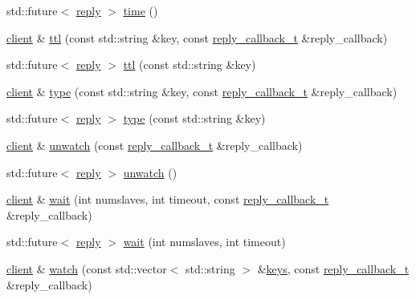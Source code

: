 \begin{DoxyCompactItemize}
std\+::future$<$ \hyperlink{classcpp__redis_1_1reply}{reply} $>$ \hyperlink{classcpp__redis_1_1client_a7d0d5e0a02e97ad6d8733430489df321}{time} ()
\item 
\hyperlink{classcpp__redis_1_1client}{client} \& \hyperlink{classcpp__redis_1_1client_a667bb7a6ead9c8cdaba534033a467367}{ttl} (const std\+::string \&key, const \hyperlink{classcpp__redis_1_1client_a061a1140d36d2eaeda82b09a0bb3f9f2}{reply\+\_\+callback\+\_\+t} \&reply\+\_\+callback)
\item 
std\+::future$<$ \hyperlink{classcpp__redis_1_1reply}{reply} $>$ \hyperlink{classcpp__redis_1_1client_afc4697ccb77bb16ff13c425b93ef7c1d}{ttl} (const std\+::string \&key)
\item 
\hyperlink{classcpp__redis_1_1client}{client} \& \hyperlink{classcpp__redis_1_1client_ac284ea9a5c0e95d49a675403aaf4847c}{type} (const std\+::string \&key, const \hyperlink{classcpp__redis_1_1client_a061a1140d36d2eaeda82b09a0bb3f9f2}{reply\+\_\+callback\+\_\+t} \&reply\+\_\+callback)
\item 
std\+::future$<$ \hyperlink{classcpp__redis_1_1reply}{reply} $>$ \hyperlink{classcpp__redis_1_1client_a143f362032218fef03b3408a761b8851}{type} (const std\+::string \&key)
\item 
\hyperlink{classcpp__redis_1_1client}{client} \& \hyperlink{classcpp__redis_1_1client_aaf19c28495b74c8c22a8d86e80a1557e}{unwatch} (const \hyperlink{classcpp__redis_1_1client_a061a1140d36d2eaeda82b09a0bb3f9f2}{reply\+\_\+callback\+\_\+t} \&reply\+\_\+callback)
\item 
std\+::future$<$ \hyperlink{classcpp__redis_1_1reply}{reply} $>$ \hyperlink{classcpp__redis_1_1client_a006e1258d7857f2d83bd9be48945f79a}{unwatch} ()
\item 
\hyperlink{classcpp__redis_1_1client}{client} \& \hyperlink{classcpp__redis_1_1client_ab7e11ccc1fb07ae3dce860042b96f4d9}{wait} (int numslaves, int timeout, const \hyperlink{classcpp__redis_1_1client_a061a1140d36d2eaeda82b09a0bb3f9f2}{reply\+\_\+callback\+\_\+t} \&reply\+\_\+callback)
\item 
std\+::future$<$ \hyperlink{classcpp__redis_1_1reply}{reply} $>$ \hyperlink{classcpp__redis_1_1client_a4ef6f516a3dcdea1b317bb4e5e96e680}{wait} (int numslaves, int timeout)
\item 
\hyperlink{classcpp__redis_1_1client}{client} \& \hyperlink{classcpp__redis_1_1client_a7faae4f59e4b7f5b5003dcfbbf04af89}{watch} (const std\+::vector$<$ std\+::string $>$ \&\hyperlink{classcpp__redis_1_1client_acb7845a206b2321e6919c2f38282c322}{keys}, const \hyperlink{classcpp__redis_1_1client_a061a1140d36d2eaeda82b09a0bb3f9f2}{reply\+\_\+callback\+\_\+t} \&reply\+\_\+callback)

\end{DoxyCompactItemize}
